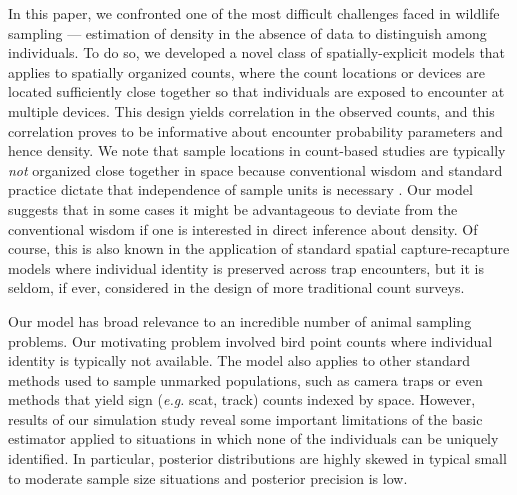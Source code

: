 In this paper, we confronted one of the most difficult challenges
faced in wildlife sampling ---
estimation of density in the absence of data to distinguish among
individuals. To do so, we developed a novel class of
spatially-explicit models that
applies to spatially organized counts, where the count locations or
devices are located sufficiently close together so that individuals
are exposed to encounter at multiple devices. This design yields
correlation in the observed counts, and this correlation proves to be
informative about encounter probability parameters and hence density.
We note that sample locations in count-based studies are typically
{\it not} organized close
together in space because conventional wisdom and standard practice
dictate that independence of sample units is necessary
\citep{hurlbert:1984}. Our model
suggests that in some cases it might be advantageous to deviate from
the conventional wisdom if one is interested in direct inference about
density. Of course, this is also known in the application of standard spatial
capture-recapture  models \citep{borchers_efford:2008}
where individual
identity is preserved across trap encounters, but it is seldom, if
ever, considered in the design of more traditional count surveys.

Our model has broad relevance to an incredible number of animal
sampling problems. Our motivating problem involved bird point counts
where individual
identity is typically not available. The model also applies
to other standard methods used to sample unmarked
populations,  such as camera traps
or even methods that yield sign ({\it e.g.} scat, track) counts
indexed by space. However, results of our simulation study reveal some
important limitations of the basic
estimator applied to situations in which none of the individuals can
be uniquely identified. In particular, posterior
distributions are highly skewed in typical small to moderate sample
size situations and posterior precision is low.

